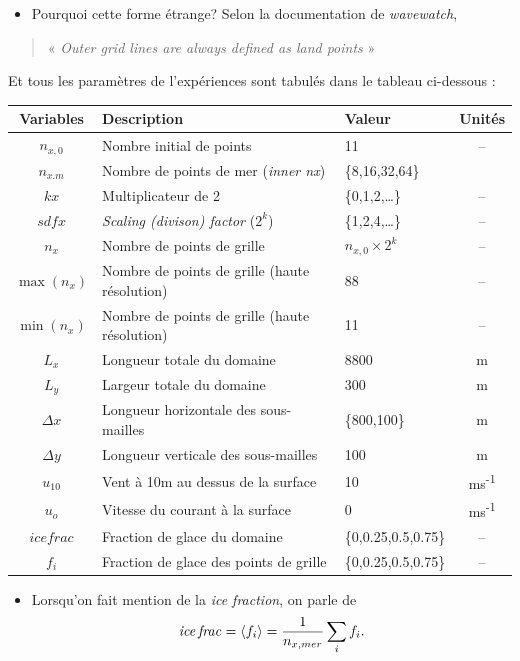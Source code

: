 \documentclass[10pt]{article}
\numberwithin{equation}{section}
\begin{document}
\begin{itemize}
\item Pourquoi cette forme étrange? Selon la documentation de \emph{wavewatch},
\end{itemize}
\begin{quote}
« \emph{Outer grid lines are always defined as land points} »
\end{quote}
Et tous les paramètres de l'expériences sont tabulés dans le tableau ci-dessous : 

\begin{center}
\begin{tabular}{cllc}
\hline
\hline
Variables & Description & Valeur & Unités\\
\hline
\(n_{x,0}\) & Nombre initial de points & 11 & --\\
\(n_{x.m}\) & Nombre de points de mer (\emph{inner nx}) & \{8,16,32,64\} & \\
\(kx\) & Multiplicateur de 2 & \{0,1,2,\ldots{}\} & --\\
\(sdfx\) & \emph{Scaling (divison) factor} (\(2^k\)) & \{1,2,4,\ldots{}\} & --\\
\(n_x\) & Nombre de points de grille & \(n_{x,0}\times2^k\) & --\\
\(\max(n_x)\) & Nombre de points de grille (haute résolution) & 88 & --\\
\(\min(n_x)\) & Nombre de points de grille (haute résolution) & 11 & --\\
\hline
\(L_x\) & Longueur totale du domaine & 8800 & m\\
\(L_y\) & Largeur totale du domaine & 300 & m\\
\(\Delta x\) & Longueur horizontale des sous-mailles & \{800,100\} & m\\
\(\Delta y\) & Longueur verticale des sous-mailles & 100 & m\\
\hline
\(u_{10}\) & Vent à 10m au dessus de la surface & 10 & ms\textsuperscript{-1}\\
\(u_o\) & Vitesse du courant à la surface & 0 & ms\textsuperscript{-1}\\
\(ice frac\) & Fraction de glace du domaine & \{0,0.25,0.5,0.75\} & --\\
\(f_i\) & Fraction de glace des points de grille & \{0,0.25,0.5,0.75\} & --\\
\hline
\end{tabular}
\end{center}

\begin{itemize}
\item Lorsqu'on fait mention de la \emph{ice fraction}, on parle de
\begin{equation}
   \mathit{ice\, frac} = \expval{f_i} = \frac{1}{n_{x,mer}}\sum_i f_i.
\end{equation}
\end{itemize}
\end{document}
